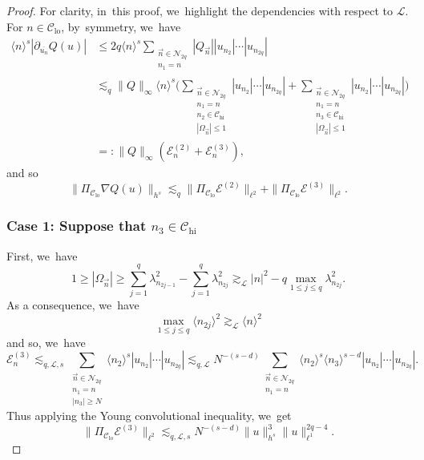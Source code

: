 \documentclass[JEP,XML,SOM,Unicode,published]{cedram}
\theoremstyle{plain}
\theoremstyle{definition}
\DeclareMathOperator{\hi}{hi}
\DeclareMathOperator{\lo}{lo}
\newcommand{\1}{\mathbf{1}}
\newcommand{\Clo}{\mathscr{C}_{\lo}}
\newcommand{\Chigh}{\mathscr{C}_{\hi}}
\begin{document}
\begin{proof} For clarity, in~this proof, we~highlight the dependencies with respect to $\mathscr{L}$. For $n\in\Clo$, by~symmetry, we~have\vspace*{-3pt}
\begin{equation*}
\begin{split}
\langle n\rangle^{s}|\partial_{\overline{u_n}} Q(u)| &\leq 2q\langle n\rangle^{s}\sum_{\substack{\vec{n}\in\mathcal{N}_{2q} \\n_{1}=n}}|Q_{\vec{n}}||u_{n_{2}}|\cdots|u_{n_{2q}}| \\
&\lesssim_q \|Q\|_{\infty}\langle n\rangle^{s} \big(\sum_{\substack{\vec{n}\in\mathcal{N}_{2q}\\n_{1}=n \\ n_2 \in \Chigh \\ |\Omega_{\vec{n}}|\leq 1 }}|u_{n_{2}}|\cdots|u_{n_{2q}}| + \sum_{\substack{\vec{n}\in\mathcal{N}_{2q}\\n_{1}=n \\ n_3 \in \Chigh \\ |\Omega_{\vec{n}}|\leq 1 }}|u_{n_{2}}|\cdots|u_{n_{2q}}| \big) \\ & =: \|Q\|_{\infty} (\mathcal{E}^{(2)}_n + \mathcal{E}^{(3)}_n),
\end{split}
\end{equation*}
and so\vspace*{-3pt}
\[
\|\Pi_{\Clo} \nabla Q(u)\|_{h^{s}} \lesssim_q \| \Pi_{\Clo} \mathcal{E}^{(2)} \|_{\ell^2} + \| \Pi_{\Clo} \mathcal{E}^{(3)} \|_{\ell^2}.
\]

\subsubsection*{Case 1: Suppose that $n_3 \in \Chigh$}
First, we~have\vspace*{-3pt}
\[
1\geq |\Omega_{\vec{n}}| \geq \sum_{j=1}^q \lambda_{n_{2j-1}}^2 - \sum_{j=1}^q \lambda_{n_{2j}}^2 \gtrsim_{\mathscr{L}} |n|^2 - q\max_{1\leq j \leq q} \lambda_{n_{2j}}^2.
\]
As a consequence, we~have\vspace*{-3pt}
\[
\max_{1\leq j \leq q} \langle n_{2j} \rangle^2 \gtrsim_{\mathscr{L}} \langle n\rangle^2
\]
and so, we~have
\[
\mathcal{E}^{(3)}_n \lesssim_{q,\mathscr{L},s} \sum_{\substack{\vec{n}\in\mathcal{N}_{2q}\\ n_1=n \\ |n_3| \geq N }} \langle n_2 \rangle^{s} |u_{n_{2}}|\cdots|u_{n_{2q}}| \lesssim_{q,\mathscr{L}} N^{-(s-d)} \sum_{\substack{\vec{n}\in\mathcal{N}_{2q}\\ n_1=n}} \langle n_2 \rangle^{s} \langle n_3 \rangle^{s-d} |u_{n_{2}}|\cdots|u_{n_{2q}}|.
\]
Thus applying the Young convolutional inequality, we~get\vspace*{-3pt}
\[
\| \Pi_{\Clo} \mathcal{E}^{(3)} \|_{\ell^2} \lesssim_{q,\mathscr{L},s} N^{-(s-d)}\|u\|_{h^{s}}^{3}\|u\|_{\ell^{1}}^{2q-4}.
\]


\end{proof}
\end{document}
